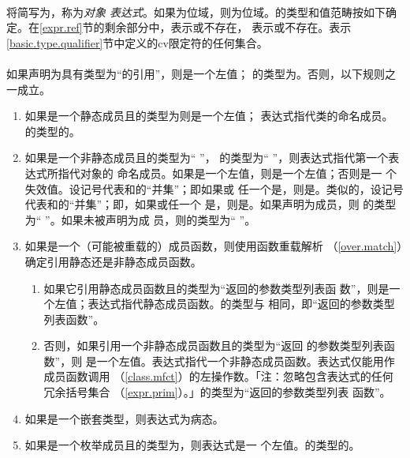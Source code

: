 \paragraph{}
将简写为，称为\textit{对象
表达式}。如果为位域，则为位域。的类型和值范畴按如下确
定。在\ref{expr.ref}节的剩余部分中，表示或不存在，
表示或不存在。表示
\ref{basic.type.qualifier}节中定义的cv限定符的任何集合。

\paragraph{}
如果声明为具有类型为``的引用''，则是一个左值；
的类型为。否则，以下规则之一成立。
\begin{enumerate}
  \item{如果是一个静态成员且的类型为则是一个左值；
    表达式指代类的命名成员。的类型的。}
  \item{如果是一个非静态成员且的类型为`` ''，
    的类型为`` ''，则表达式指代第一个表达式所指代对象的
    命名成员。如果是一个左值，则是一个左值；否则是一
    个失效值。设记号代表和的``并集''；即如果或
    任一个是，则是。类似的，设记号
    代表和的``并集''；即，如果或任一个
    是，则是。如果声明为成员，则
    的类型为`` ''。如果未被声明为成
    员，则的类型为`` ''。}
  \item{如果是一个（可能被重载的）成员函数，则使用函数重载解析
    （\ref{over.match}）确定引用静态还是非静态成员函数。
    \begin{enumerate}
      \item{如果它引用静态成员函数且的类型为``返回的参数类型列表函
        数''，则是一个左值；表达式指代静态成员函数。的类型与
        相同，即``返回的参数类型列表函数''。}
      \item{否则，如果引用一个非静态成员函数且的类型为``返回
        的参数类型列表函数''，则
        是一个左值。表达式指代一个非静态成员函数。表达式仅能用作成员函数调用
        （\ref{class.mfct}）的左操作数。「注：忽略包含表达式的任何冗余括号集合
        （\ref{expr.prim}）。」的类型为``返回的参数类型列表
        函数''。}
    \end{enumerate}
  }
  \item{如果是一个嵌套类型，则表达式为病态。}
  \item{如果是一个枚举成员且的类型为，则表达式是一
    个左值。的类型的。}
\end{enumerate}

